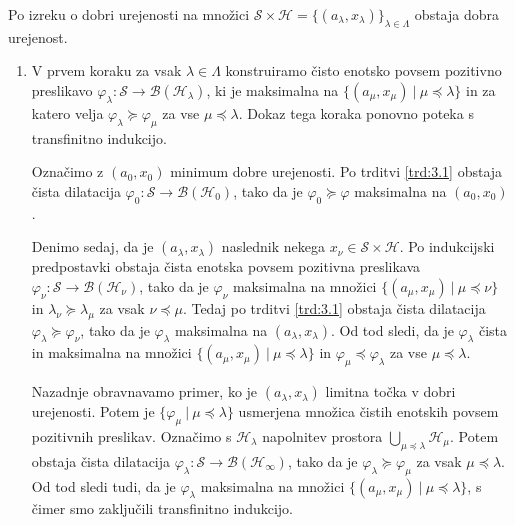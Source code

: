 \begin{dokaz}
    Po izreku o dobri urejenosti na množici $\mathcal{S} \times \mathcal{H} = \{(a_\lambda, x_\lambda)\}_{\lambda \in \Lambda}$ obstaja dobra urejenost.
    \begin{enumerate}
        \item V prvem koraku za vsak $\lambda \in \Lambda$ konstruiramo čisto enotsko povsem pozitivno preslikavo $\varphi_\lambda: \mathcal{S} \to \mathcal{B} (\mathcal{H}_\lambda)$,
        ki je maksimalna na $\{(a_\mu, x_\mu) \ |\ \mu \preceq \lambda\}$
        in za katero velja $\varphi_\lambda \succeq \varphi_\mu$ za vse $\mu \preceq \lambda$.
        Dokaz tega koraka ponovno poteka s transfinitno indukcijo.

        Označimo z $(a_0, x_0)$ minimum dobre urejenosti. Po trditvi \ref{trd:3.1} obstaja čista dilatacija $\varphi_0: \mathcal{S} \to \mathcal{B}(\mathcal{H}_0)$,
        tako da je $\varphi_0 \succeq \varphi$ maksimalna na $(a_0, x_0)$.    

        Denimo sedaj, da je $(a_\lambda, x_\lambda)$ naslednik nekega $x_\nu \in \mathcal{S} \times \mathcal{H}$.
        Po indukcijski predpostavki obstaja čista enotska povsem pozitivna preslikava $\varphi_\nu: \mathcal{S} \to \mathcal{B}(\mathcal{H}_\nu)$,
        tako da je $\varphi_\nu$ maksimalna na množici $\{(a_\mu, x_\mu) \ |\ \mu \preceq \nu\}$ in $\lambda_\nu \succeq \lambda_\mu$
        za vsak $\nu \preceq \mu$.
        Tedaj po trditvi \ref{trd:3.1} obstaja čista dilatacija $\varphi_\lambda \succeq \varphi_\nu$,
        tako da je $\varphi_\lambda$ maksimalna na $(a_\lambda, x_\lambda)$. Od tod sledi, da je 
        $\varphi_\lambda$ čista in maksimalna na množici $\{(a_\mu, x_\mu) \ |\ \mu \preceq \lambda\}$ in $\varphi_\mu \preceq \varphi_\lambda$
        za vse $\mu \preceq \lambda$.

        Nazadnje obravnavamo primer, ko je $(a_\lambda, x_\lambda)$ limitna točka v dobri urejenosti.
        Potem je $\{\varphi_\mu\ |\ \mu \preceq \lambda\}$ usmerjena množica čistih enotskih povsem pozitivnih preslikav.
        Označimo s $\mathcal{H}_\lambda$ napolnitev prostora $\bigcup_{\mu \preceq \lambda} \mathcal{H}_\mu$.
        Potem obstaja čista dilatacija $\varphi_\lambda: \mathcal{S} \to \mathcal{B} (\mathcal{H}_\infty)$, tako da je $\varphi_\lambda \succeq \varphi_\mu$
        za vsak $\mu \preceq \lambda$. Od tod sledi tudi, da je $\varphi_\lambda$ maksimalna na množici $\{(a_\mu, x_\mu)\ |\ \mu \preceq \lambda\}$,
        s čimer smo zaključili transfinitno indukcijo. 


\end{enumerate}
\end{dokaz}
